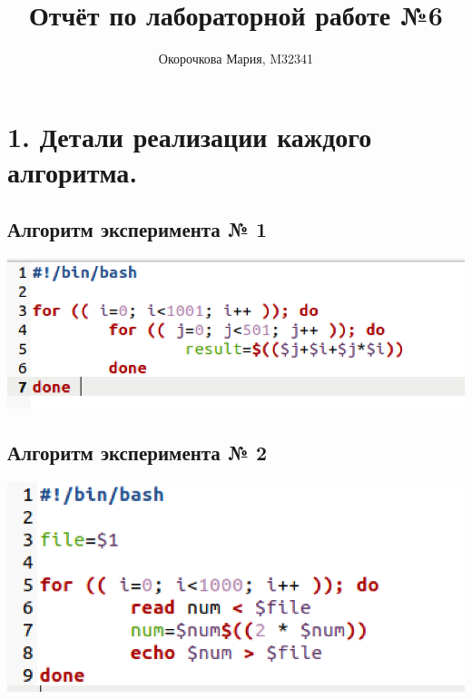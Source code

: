 \documentclass[10pt, a4paper]{article}
\begin{document}
\title{Отчёт по лабораторной работе №6}
\author{Окорочкова Мария, M32341}

\maketitle

\section*{1. Детали реализации каждого алгоритма.}
\subsection*{Алгоритм эксперимента № 1}
\includegraphics[scale=0.7]{scripts/algo1.png}
\subsection*{Алгоритм эксперимента № 2}
\includegraphics[scale=0.8]{scripts/algo2.png}
\end{document}
